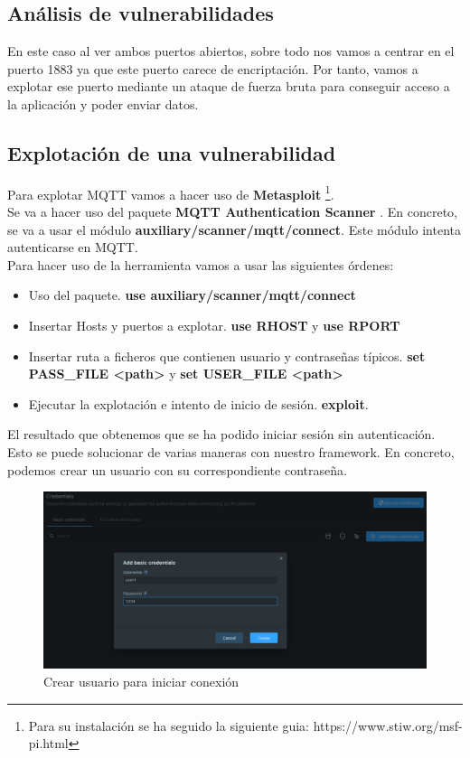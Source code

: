 {\subsection{Análisis de vulnerabilidades}

En este caso al ver ambos puertos abiertos, sobre todo nos vamos a centrar en el puerto 1883 ya que este puerto carece de encriptación. Por tanto, vamos a explotar ese puerto mediante un ataque de fuerza bruta para conseguir acceso a la aplicación y poder enviar datos.

\subsection{Explotación de una vulnerabilidad}

Para explotar MQTT vamos a hacer uso de \textbf{Metasploit} \footnote{Para su instalación se ha seguido la siguiente guia: https://www.stiw.org/msf-pi.html}. \\

Se va a hacer uso del paquete \textbf{MQTT Authentication Scanner} \cite{use-metasploit-mqtt}. En concreto, se va a usar el módulo \textbf{auxiliary/scanner/mqtt/connect}. Este módulo intenta autenticarse en MQTT. \\

Para hacer uso de la herramienta vamos a usar las siguientes órdenes:

\begin{itemize}
    \item Uso del paquete. \textbf{use auxiliary/scanner/mqtt/connect}
    \item Insertar Hosts y puertos a explotar. \textbf{use RHOST} y \textbf{use RPORT}
    \item Insertar ruta a ficheros que contienen usuario y contraseñas típicos. \textbf{set PASS\_FILE <path>} y \textbf{set USER\_FILE <path>}
    \item Ejecutar la explotación e intento de inicio de sesión. \textbf{exploit}.
\end{itemize}

El resultado que obtenemos que se ha podido iniciar sesión sin autenticación. Esto se puede solucionar de varias maneras con nuestro framework. En concreto, podemos crear un usuario con su correspondiente contraseña. \\

\begin{figure}[p]
    \centering
    \includegraphics[width=\linewidth]{imagenes/Captura de pantalla 2022-06-13 180308.png}
    \caption{Crear usuario para iniciar conexión}
    \label{fig:figure11-imp}
\end{figure}

}
